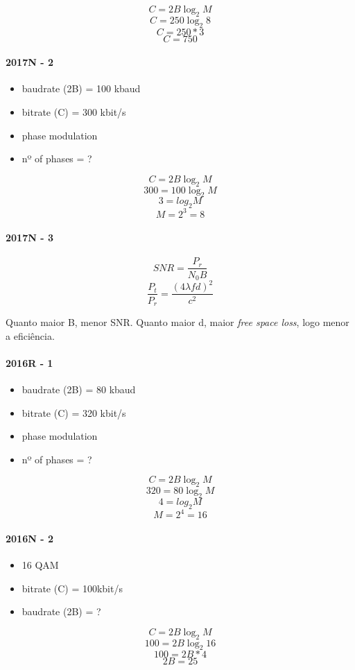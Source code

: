 \documentclass[../resumosRCOM.tex]{subfiles}
\begin{document}
\[C = 2B\log_2 M\]
\[C = 250\log_2 8\]
\[C = 250*3\]
\[C = 750\]

\paragraph{2017N - 2}
\begin{itemize}
    \item baudrate (2B) = 100 kbaud
    \item bitrate (C) = 300 kbit/s
    \item phase modulation
    \item nº of phases = ?
\end{itemize}

\[C = 2B\log_2 M\]
\[300 = 100\log_2 M\]
\[3 = log_2 M\]
\[M = 2^3 = 8\]

\paragraph{2017N - 3}
\[SNR = \frac{P_r}{N_0B}\]
\[\frac{P_t}{P_r}=\frac{(4\lambda fd)^2}{c^2}\]

Quanto maior B, menor SNR. Quanto maior d, maior \textit{free space loss}, logo menor a eficiência.

\paragraph{2016R - 1}
\begin{itemize}
    \item baudrate (2B) = 80 kbaud
    \item bitrate (C) = 320 kbit/s
    \item phase modulation
    \item nº of phases = ?
\end{itemize}

\[C = 2B\log_2 M\]
\[320 = 80\log_2 M\]
\[4 = log_2 M\]
\[M = 2^4 = 16\]

\paragraph{2016N - 2}
\begin{itemize}
    \item 16 QAM
    \item bitrate (C) = 100kbit/s
    \item baudrate (2B) = ?
\end{itemize}

\[C = 2B\log_2 M\]
\[100 = 2B\log_2 16\]
\[100 = 2B*4\]
\[2B = 25\]
\end{document}

